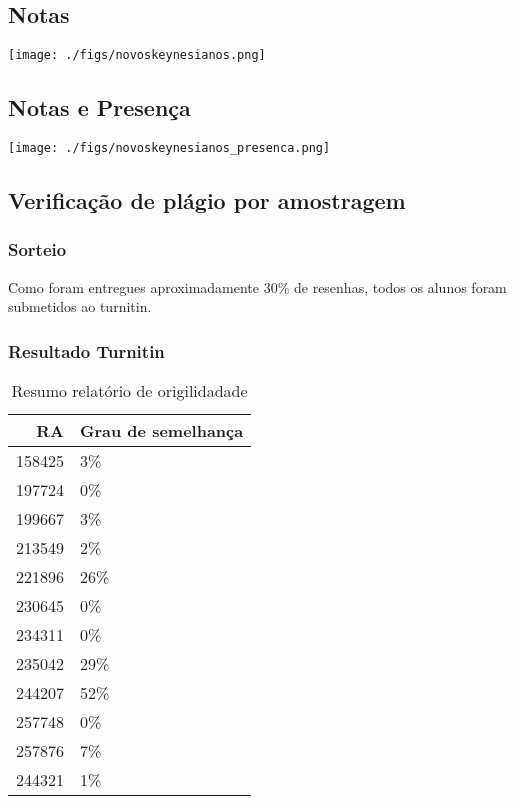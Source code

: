 \documentclass[11pt]{article}
\begin{document}
\subsection{Notas}
\label{sec:org164f97e}
\begin{center}
\texttt{[image: ./figs/novoskeynesianos.png]}
\end{center}




\subsection{Notas e Presença}
\label{sec:orge143be9}
\begin{center}
\texttt{[image: ./figs/novoskeynesianos\_presenca.png]}
\end{center}
\subsection{Verificação de plágio por amostragem}
\label{sec:org6c5bf76}
\subsubsection{Sorteio}
\label{sec:orgf20944c}

Como foram entregues aproximadamente 30\% de resenhas, todos os alunos foram submetidos ao turnitin.

\subsubsection{Resultado Turnitin}
\label{sec:org522fdcc}

\begin{table}[htbp]
\caption{\label{TurnitinNvK}Resumo relatório de origilidadade}
\centering
\begin{tabular}{rl}
\hline
RA & Grau de semelhança\\
\hline
158425 & 3\%\\
197724 & 0\%\\
199667 & 3\%\\
213549 & 2\%\\
221896 & 26\%\\
230645 & 0\%\\
234311 & 0\%\\
235042 & 29\%\\
244207 & 52\%\\
257748 & 0\%\\
257876 & 7\%\\
244321 & 1\%\\
\hline
\end{tabular}
\end{table}
\end{document}
